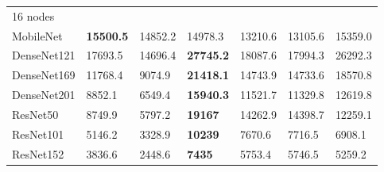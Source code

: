 \begin{table}
\begin{tabular}{lllllll}
    16 nodes    & ~ & ~ & ~     & ~     & ~    & ~    \\
    MobileNet   & \textbf{15500.5}   & 14852.2      & 14978.3 & 13210.6 & 13105.6 & 15359.0   \\
    DenseNet121 & 17693.5   & 14696.4      & \textbf{27745.2} & 18087.6 & 17994.3 & 26292.3 \\
    DenseNet169 & 11768.4   & 9074.9       & \textbf{21418.1} & 14743.9 & 14733.6 & 18570.8 \\
    DenseNet201 & 8852.1    & 6549.4       & \textbf{15940.3} & 11521.7 & 11329.8 & 12619.8 \\
    ResNet50    & 8749.9    & 5797.2       & \textbf{19167}   & 14262.9 & 14398.7 & 12259.1 \\
    ResNet101   & 5146.2    & 3328.9       & \textbf{10239}   & 7670.6  & 7716.5  & 6908.1  \\
    ResNet152   & 3836.6    & 2448.6       & \textbf{7435}    & 5753.4  & 5746.5  & 5259.2  \\
    \end{tabular}
    \label{tbl:pap_hvd_narval_full}
\end{table}